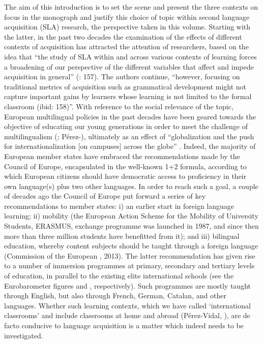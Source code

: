 The aim of this introduction is to set the scene and present the three contexts on focus in the monograph and justify this choice of topic within second language acquisition (SLA) research, the perspective taken in this volume. Starting with the latter, in the past two decades the examination of the effects of different contexts of acquisition has attracted the attention of researchers, based on the idea that “the study of SLA within and across various contexts of learning forces a broadening of our perspective of the different variables that affect and impede acquisition in general” (\citealt{CollentineFreed2004b}: 157). The authors continue, “however, focusing on traditional metrics of acquisition such as grammatical development might not capture important gains by learners whose learning is not limited to the formal classroom (ibid: 158)”. With reference to the social relevance of the topic, European multilingual policies in the past decades have been geared towards the objective of educating our young generations in order to meet the challenge of multilingualism (\citealt{Coleman2015}; Pérez-\citealt{Vidal2015a}), ultimately as an effect of “globalization and the push for internationalization [on campuses] across the globe” \citep[1]{Jackson2013}. Indeed, the majority of European member states have embraced the recommendations made by the Council of Europe, encapsulated in the well-known 1+2 formula, according to which European citizens should have democratic access to proficiency in their own language(s) plus two other languages. In order to reach such a goal, a couple of decades ago the Council of Europe put forward a series of key recommendations to member states: i) an earlier start in foreign language learning; ii) mobility (the European Action Scheme for the Mobility of University Students, ERASMUS, exchange programme was launched in 1987, and since then more than three million students have benefitted from it); and iii) bilingual education, whereby content subjects should be taught through a foreign language (Commission of the European \citealt{Communities1995}, 2013). The latter recommendation has given rise to a number of immersion programmes at primary, secondary and tertiary levels of education, in parallel to the existing elite international schools (see the Eurobarometer figures and \citealt{WächterMaiwörm2014}, respectively). Such programmes are mostly taught through English, but also through French, German, Catalan, and other languages. Whether such learning contexts, which we have called ‘international classrooms’ and include classrooms at home and abroad (Pérez-Vidal, \citealt{LorenzoTrenchs2017}), are de facto conducive to language acquisition is a matter which indeed needs to be investigated. 

